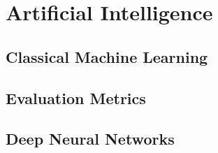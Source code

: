 \section{Artificial Intelligence} \label{sec:bt_ArtificialIntelligence}

\subsection{Classical Machine Learning}
\subsection{Evaluation Metrics}
\subsection{Deep Neural Networks}